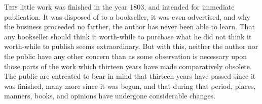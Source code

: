 
\vfill
\lettrine{T}{his} little work was finished in the year 1803, and intended for immediate
publication. It was disposed of to a bookseller, it was even advertised, and
why the business proceeded no farther, the author has never been able to learn.
That any bookseller should think it worth-while to purchase what he did not
think it worth-while to publish seems extraordinary. But with this, neither the
author nor the public have any other concern than as some observation is
necessary upon those parts of the work which thirteen years have made
comparatively obsolete. The public are entreated to bear in mind that thirteen
years have passed since it was finished, many more since it was begun, and that
during that period, places, manners, books, and opinions have undergone
considerable changes.
\vfill
